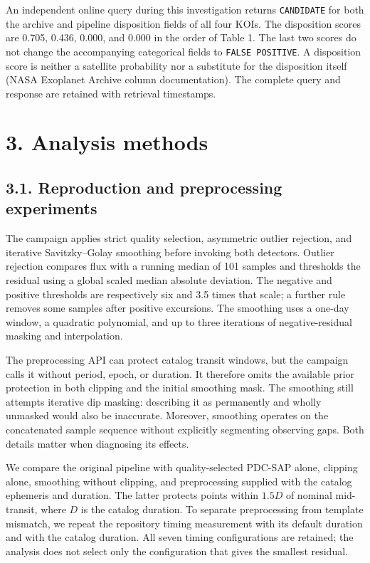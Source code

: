 \documentclass[
  english,
]{article}
\begin{document}
An independent online query during this investigation returns
\texttt{CANDIDATE} for both the archive and pipeline disposition fields
of all four KOIs. The disposition scores are 0.705, 0.436, 0.000, and
0.000 in the order of Table 1. The last two scores do not change the
accompanying categorical fields to \texttt{FALSE\ POSITIVE}. A
disposition score is neither a satellite probability nor a substitute
for the disposition itself (NASA Exoplanet Archive column
documentation). The complete query and response are retained with
retrieval timestamps.

\section{3. Analysis methods}\label{analysis-methods}

\subsection{3.1. Reproduction and preprocessing
experiments}\label{reproduction-and-preprocessing-experiments}

The campaign applies strict quality selection, asymmetric outlier
rejection, and iterative Savitzky--Golay smoothing before invoking both
detectors. Outlier rejection compares flux with a running median of 101
samples and thresholds the residual using a global scaled median
absolute deviation. The negative and positive thresholds are
respectively six and 3.5 times that scale; a further rule removes some
samples after positive excursions. The smoothing uses a one-day window,
a quadratic polynomial, and up to three iterations of negative-residual
masking and interpolation.

The preprocessing API can protect catalog transit windows, but the
campaign calls it without period, epoch, or duration. It therefore omits
the available prior protection in both clipping and the initial
smoothing mask. The smoothing still attempts iterative dip masking:
describing it as permanently and wholly unmasked would also be
inaccurate. Moreover, smoothing operates on the concatenated sample
sequence without explicitly segmenting observing gaps. Both details
matter when diagnosing its effects.

We compare the original pipeline with quality-selected PDC-SAP alone,
clipping alone, smoothing without clipping, and preprocessing supplied
with the catalog ephemeris and duration. The latter protects points
within \(1.5D\) of nominal mid-transit, where \(D\) is the catalog
duration. To separate preprocessing from template mismatch, we repeat
the repository timing measurement with its default duration and with the
catalog duration. All seven timing configurations are retained; the
analysis does not select only the configuration that gives the smallest
residual.
\end{document}
